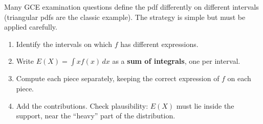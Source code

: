\documentclass[11pt]{article}
\begin{document}
Many GCE examination questions define the pdf differently on different intervals (triangular pdfs are the classic example). The strategy is simple but must be applied carefully.

\begin{methode}
\begin{enumerate}
\item Identify the intervals on which $f$ has different expressions.
\item Write $E(X)=\displaystyle\int x f(x)\,dx$ as a \textbf{sum of integrals}, one per interval.
\item Compute each piece separately, keeping the correct expression of $f$ on each piece.
\item Add the contributions. Check plausibility: $E(X)$ must lie inside the support, near the ``heavy'' part of the distribution.
\end{enumerate}
\end{methode}
\end{document}
